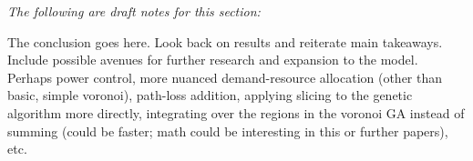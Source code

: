 \documentclass[onecolumn,draftcls]{IEEEtran}
\begin{document}
\noindent {\color{red} \rule{\linewidth}{0.5mm}}

\textit{The following are draft notes for this section:}

The conclusion goes here.  Look back on results and reiterate main takeaways.  Include possible avenues for further research and expansion to the model.  Perhaps power control, more nuanced demand-resource allocation (other than basic, simple voronoi), path-loss addition, applying slicing to the genetic algorithm more directly, integrating over the regions in the voronoi GA instead of summing (could be faster; math could be interesting in this or further papers), etc.















%
%
%
\iffalse
\begin{thebibliography}{2}

\bibitem{IEEEhowto:kopka}
H.~Kopka and P.~W. Daly, \emph{A Guide to \LaTeX}, 3rd~ed.\hskip 1em plus
  0.5em minus 0.4em\relax Harlow, England: Addison-Wesley, 1999.  Sample bib from template.
  
\bibitem{test:teague}
K.~Teague

\end{thebibliography}
\fi





\end{document}

